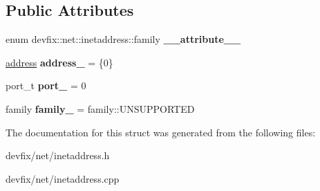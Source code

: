 \subsection*{Public Attributes}
\begin{DoxyCompactItemize}
\item 
\mbox{\label{structdevfix_1_1net_1_1inetaddress_a3752ca3c3b6522ec4e1777287627cbe3}} 
enum devfix\+::net\+::inetaddress\+::family {\bfseries \+\_\+\+\_\+attribute\+\_\+\+\_\+}
\item 
\mbox{\label{structdevfix_1_1net_1_1inetaddress_a902c9b8140f7c1fad452ef9de7f86561}} 
\hyperlink{uniondevfix_1_1net_1_1inetaddress_1_1address}{address} {\bfseries address\+\_\+} = \{0\}
\item 
\mbox{\label{structdevfix_1_1net_1_1inetaddress_a3b666575020939365ebcec1d7aeb0f34}} 
port\+\_\+t {\bfseries port\+\_\+} = 0
\item 
\mbox{\label{structdevfix_1_1net_1_1inetaddress_af025a2c8b37c28f5553f6f0c350d3765}} 
family {\bfseries family\+\_\+} = family\+::\+U\+N\+S\+U\+P\+P\+O\+R\+T\+ED
\end{DoxyCompactItemize}


The documentation for this struct was generated from the following files\+:\begin{DoxyCompactItemize}
\item 
devfix/net/inetaddress.\+h\item 
devfix/net/inetaddress.\+cpp\end{DoxyCompactItemize}
